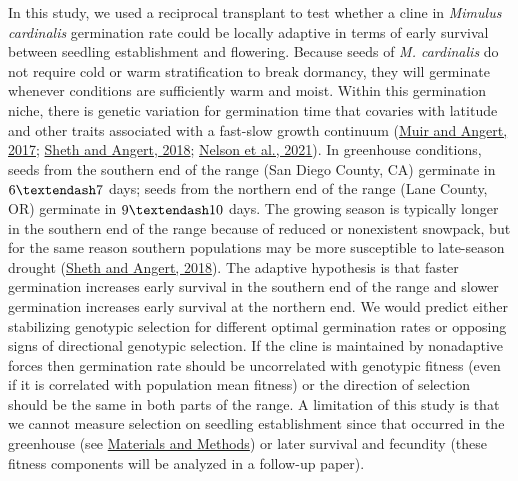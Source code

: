 \documentclass[
  12pt,
]{article}
\begin{document}
In this study, we used a reciprocal transplant to test whether a cline in \emph{Mimulus cardinalis} germination rate could be locally adaptive in terms of early survival between seedling establishment and flowering. Because seeds of \emph{M. cardinalis} do not require cold or warm stratification to break dormancy, they will germinate whenever conditions are sufficiently warm and moist. Within this germination niche, there is genetic variation for germination time that covaries with latitude and other traits associated with a fast-slow growth continuum (\protect\hyperlink{ref-muir_grow_2017}{Muir and Angert, 2017}; \protect\hyperlink{ref-sheth_demographic_2018}{Sheth and Angert, 2018}; \protect\hyperlink{ref-nelson_quantitative_2021}{Nelson et al., 2021}). In greenhouse conditions, seeds from the southern end of the range (San Diego County, CA) germinate in \(6 \textendash 7\) days; seeds from the northern end of the range (Lane County, OR) germinate in \(9 \textendash 10\) days. The growing season is typically longer in the southern end of the range because of reduced or nonexistent snowpack, but for the same reason southern populations may be more susceptible to late-season drought (\protect\hyperlink{ref-sheth_demographic_2018}{Sheth and Angert, 2018}). The adaptive hypothesis is that faster germination increases early survival in the southern end of the range and slower germination increases early survival at the northern end. We would predict either stabilizing genotypic selection for different optimal germination rates or opposing signs of directional genotypic selection. If the cline is maintained by nonadaptive forces then germination rate should be uncorrelated with genotypic fitness (even if it is correlated with population mean fitness) or the direction of selection should be the same in both parts of the range. A limitation of this study is that we cannot measure selection on seedling establishment since that occurred in the greenhouse (see \protect\hyperlink{materials-and-methods}{Materials and Methods}) or later survival and fecundity (these fitness components will be analyzed in a follow-up paper).
\end{document}
